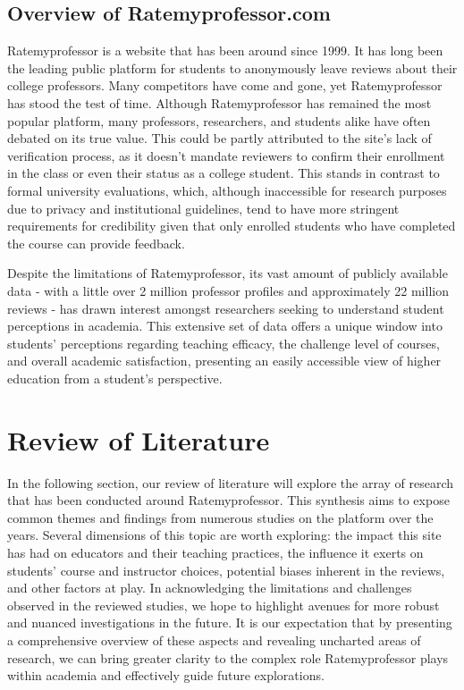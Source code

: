 \documentclass[doc, 12pt, twocolumn]{apa7}
\begin{document}
\subsection{Overview of Ratemyprofessor.com}
Ratemyprofessor is a website that has been around since 1999. It has long been the leading public platform for students to anonymously leave reviews about their college professors. Many competitors have come and gone, yet Ratemyprofessor has stood the test of time. Although Ratemyprofessor has remained the most popular platform, many professors, researchers, and students alike have often debated on its true value. This could be partly attributed to the site's lack of verification process, as it doesn't mandate reviewers to confirm their enrollment in the class or even their status as a college student. This stands in contrast to formal university evaluations, which, although inaccessible for research purposes due to privacy and institutional guidelines, tend to have more stringent requirements for credibility given that only enrolled students who have completed the course can provide feedback.

Despite the limitations of Ratemyprofessor, its vast amount of publicly available data - with a little over 2 million professor profiles and approximately 22 million reviews - has drawn interest amongst researchers seeking to understand student perceptions in academia. This extensive set of data offers a unique window into students' perceptions regarding teaching efficacy, the challenge level of courses, and overall academic satisfaction, presenting an easily accessible view of higher education from a student's perspective.

\section{Review of Literature}
In the following section, our review of literature will explore the array of research that has been conducted around Ratemyprofessor. This synthesis aims to expose common themes and findings from numerous studies on the platform over the years. Several dimensions of this topic are worth exploring: the impact this site has had on educators and their teaching practices, the influence it exerts on students' course and instructor choices, potential biases inherent in the reviews, and other factors at play. In acknowledging the limitations and challenges observed in the reviewed studies, we hope to highlight avenues for more robust and nuanced investigations in the future. It is our expectation that by presenting a comprehensive overview of these aspects and revealing uncharted areas of research, we can bring greater clarity to the complex role Ratemyprofessor plays within academia and effectively guide future explorations.
\end{document}
